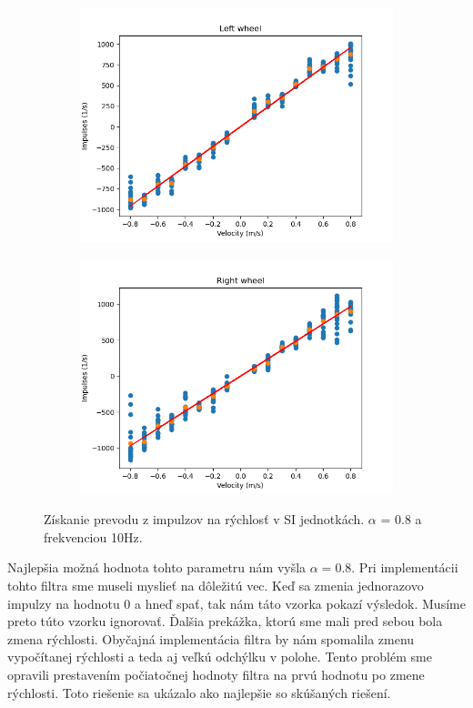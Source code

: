 \begin{figure}[!htbp]
	\begin{subfigure}{0.5\textwidth}
		\includegraphics[width=\textwidth]{img/lw_08100.png}
	\end{subfigure}
	\hfill
	\begin{subfigure}{0.5\textwidth}
		\includegraphics[width=\textwidth]{img/rw_08100.png}
	\end{subfigure}
	\caption{Získanie prevodu z impulzov na rýchlosť v SI jednotkách. \(\alpha\) = 0.8 a frekvenciou 10Hz.}
	\label{fig:rw_lw_08100}
\end{figure}

Najlepšia možná hodnota tohto parametru nám vyšla \(\alpha = 0.8\). Pri implementácii tohto filtra sme museli myslieť na dôležitú vec.
Keď sa zmenia jednorazovo impulzy na hodnotu 0 a hneď spať, tak nám táto vzorka pokazí výsledok. Musíme preto túto vzorku ignorovať. Ďalšia
prekážka, ktorú sme mali pred sebou bola zmena rýchlosti. Obyčajná implementácia filtra by nám spomalila zmenu vypočítanej rýchlosti
a teda aj veľkú odchýlku v polohe. Tento problém sme opravili prestavením počiatočnej hodnoty filtra na prvú hodnotu po zmene rýchlosti.
Toto riešenie sa ukázalo ako najlepšie so skúšaných riešení.

